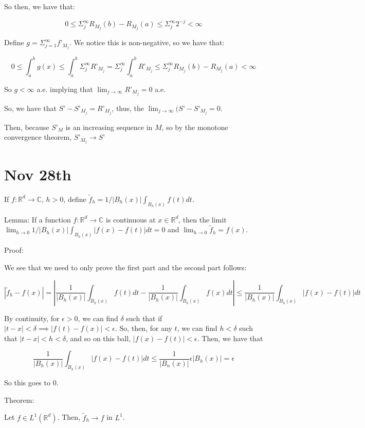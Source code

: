 \documentclass[10pt]{article}
\begin{document}
So then, we have that:

$$0 \leq \Sigma_j^\infty R_{M_j}(b) - R_{M_j}(a) \leq \Sigma_j^\infty 2^{-j} < \infty$$

Define $g = \Sigma_{j=1}^\infty f’_{M_j}$. We notice this is non-negative, so we have that:

$$ 0 \leq \int_a^b g(x) \leq \int_a^b \Sigma_j^\infty R’_{M_j} = \Sigma_j^\infty \int_a^b R’_{M_j} \leq \Sigma_j^\infty R_{M_j}(b) - R_{M_j}(a) < \infty $$

So $g < \infty$ a.e. implying that $\lim_{j \to \infty} R’_{M_j} = 0$ a.e.

So, we have that $S’ - S’_{M_j} = R’_{M_j}$, thus, the $\lim_{j \to \infty} (S’ - S’_{M_j} = 0$. 

Then, because $S’_{M}$ is an increasing sequence in $M$, so by the monotone convergence theorem, $S’_{M_j} \to S’$

\section*{Nov 28th}

If $f: \mathbb{R}^d \to \mathbb{C}$, $h > 0$, define $\tilde{f}_h = 1/|B_h(x)| \int_{B_h(x)} f(t) dt$.

Lemma: If a function $f: \mathbb{R}^d \to \mathbb{C}$ is continuous at $x \in \mathbb{R}^d$, then the limit $\lim_{h \to 0} 1/|B_h(x)| \int_{B_h(x)} |f(x) - f(t)| dt = 0$ and $\lim_{h \to 0} \tilde{f}_h = f(x)$.

Proof:

We see that we need to only prove the first part and the second part follows:

$$ \left| \tilde{f}_h - f(x) \right| = \left| \frac{1}{|B_h(x)|} \int_{B_h(x)} f(t) dt - \frac{1}{|B_h(x)|} \int_{B_h(x)} f(x) dt \right| \leq \frac{1}{|B_h(x)|}  \int_{B_h(x)} |f(x) - f(t)| dt $$

By continuity, for $\epsilon > 0$, we can find $\delta$ such that if $| t - x | < \delta \implies |f(t) - f(x)| < \epsilon$. So, then, for any $t$, we can find $h < \delta$ such that $|t - x| < h < \delta$, and so on this ball, $|f(x) - f(t)| < \epsilon$. Then, we have that 

$$ \frac{1}{|B_h(x)|} \int_{B_h(x)} |f(x) - f(t)| dt \leq \frac{1}{|B_n(x)|} \epsilon | B_h(x)|  = \epsilon $$

So this goes to 0.

Theorem:

Let $f \in L^1(\mathbb{R}^d)$. Then, $\tilde{f}_h \to f$ in $L^1$.
\end{document}
